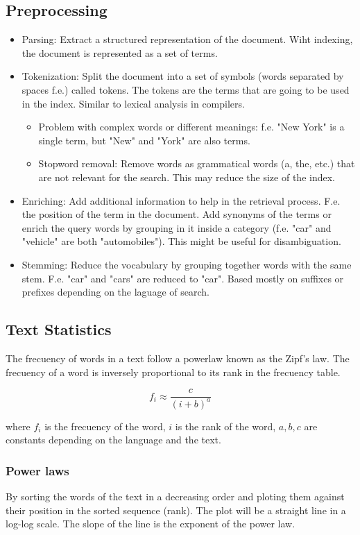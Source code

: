 \documentclass{article}
\begin{document}
\subsection{Preprocessing}
\begin{itemize}
    \item Parsing: Extract a structured representation of the document. Wiht indexing, the document is represented as a set of terms.
    \item Tokenization: Split the document into a set of symbols (words separated by spaces f.e.) called tokens. The tokens are the terms that are going to be used in the index.  Similar to lexical analysis in compilers.
    \begin{itemize}
        \item Problem with complex words or different meanings: f.e. "New York" is a single term, but "New" and "York" are also terms.
        \item Stopword removal: Remove words as grammatical words (a, the, etc.) that are not relevant for the search. This may reduce the size of the index.
    \end{itemize}
    \item Enriching: Add additional information to help in the retrieval process. F.e. the position of the term in the document. Add synonyms of the terms or enrich the query words by grouping in it inside a category (f.e. "car" and "vehicle" are both "automobiles"). This might be useful for disambiguation.
    \item Stemming: Reduce the vocabulary by grouping together words with the same stem. F.e. "car" and "cars" are reduced to "car". Based mostly on suffixes or prefixes depending on the laguage of search.
\end{itemize}
    
    \subsection{Text Statistics}
    The frecuency of words in a text follow a powerlaw known as the Zipf's law. The frecuency of a word is inversely proportional to its rank in the frecuency table.

    \begin{equation}
        f_i \approx \frac{c}{(i+b)^a}
    \end{equation}

    where $f_i$ is the frecuency of the word, $i$ is the rank of the word, $a, b, c$ are constants depending on the language and the text.

    \subsubsection{Power laws}
    By sorting the words of the text in a decreasing order and ploting them against their position in the sorted sequence (rank). The plot will be a straight line in a log-log scale. The slope of the line is the exponent of the power law.
\end{document}
